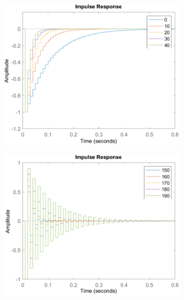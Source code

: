 \documentclass[a4paper,kul]{kulakarticle} %
\begin{document}
\begin{figure}[htp!]
	\centering
	\begin{subfigure}[b]{0.48\textwidth}
		\centering
		\includegraphics[width=\textwidth]{impulse_response1_cropped.pdf}
	\end{subfigure}
	\hfill
	\begin{subfigure}[b]{0.48\textwidth}  
		\centering 
		\includegraphics[width=\textwidth]{impulse_response2_cropped.pdf}
	\end{subfigure}
	

\end{figure}
\end{document}
